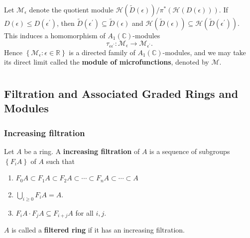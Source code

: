 \documentclass[12pt, oneside]{book}
\begin{document}
\begin{definition}
    Let $\mathcal{M}_\epsilon$ denote the quotient module $\mathcal{H}(\tilde{D}(\epsilon)) / \pi^*(\mathcal{H}(D(\epsilon)))$.
    If $D(\epsilon) \leq D(\epsilon^{\prime})$, then $\tilde{D}\left(\epsilon^{\prime}\right) \subseteq \tilde{D}(\epsilon)$ and $\mathcal{H}(\tilde{D}(\epsilon)) \subseteq \mathcal{H}\left(\tilde{D}\left(\epsilon^{\prime}\right)\right)$.
    This induces a homomorphism of $A_1(\mathbb{C})$-modules
    \begin{equation*}
        \tau_{\epsilon \epsilon^\prime}: \mathcal{M}_\epsilon \longrightarrow \mathcal{M}_{\epsilon^{\prime}} .
    \end{equation*}
    Hence $\left\{\mathcal{M}_\epsilon: \epsilon \in \mathbb{R}\right\}$ is a directed family of $A_1(\mathbb{C})$-modules, and we may take its direct limit called the \textbf{module of microfunctions}, denoted by $\mathcal{M}$.
\end{definition}


\chapter{}






\section{Filtration and Associated Graded Rings and Modules} %
\subsection{Increasing filtration} %

\begin{definition}
    Let $A$ be a ring.
    A \textbf{increasing filtration} of $A$ is a sequence of subgroups $\left\{F_iA\right\}$ of $A$ such that
    \begin{enumerate}[label=(\roman*)]
        \item
              $F_0A \subset F_1A \subset F_2A \subset \cdots \subset F_nA \subset \cdots \subset A$
        \item
              $\bigcup_{i\geq 0} F_iA=A$.
        \item
              $F_iA \cdot F_jA \subseteq F_{i+j}A$ for all $i,j$.
    \end{enumerate}
    $A$ is called a \textbf{filtered ring} if it has an increasing filtration.
\end{definition}
\end{document}
